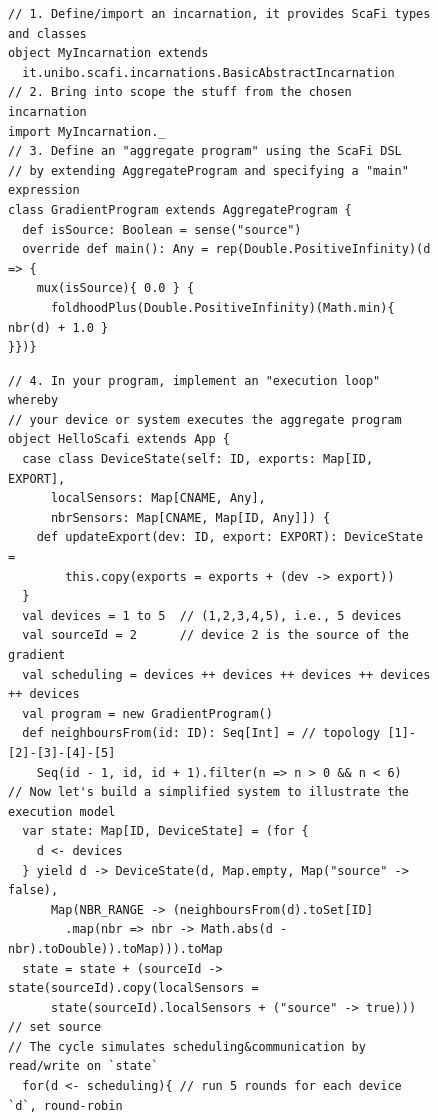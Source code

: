\begin{figure}
\newsavebox{\exoprogram}
\begin{lrbox}{\exoprogram}%
\begin{lstlisting}[basicstyle=\lst@ifdisplaystyle\footnotesize\fi\ttfamily]
// 1. Define/import an incarnation, it provides ScaFi types and classes
object MyIncarnation extends
  it.unibo.scafi.incarnations.BasicAbstractIncarnation
// 2. Bring into scope the stuff from the chosen incarnation
import MyIncarnation._
// 3. Define an "aggregate program" using the ScaFi DSL 
// by extending AggregateProgram and specifying a "main" expression
class GradientProgram extends AggregateProgram {
  def isSource: Boolean = sense("source")
  override def main(): Any = rep(Double.PositiveInfinity)(d => {
    mux(isSource){ 0.0 } {
      foldhoodPlus(Double.PositiveInfinity)(Math.min){ nbr(d) + 1.0 } 
}})}
\end{lstlisting}
\end{lrbox}
\newsavebox{\exosystem}
\begin{lrbox}{\exosystem}%
\begin{lstlisting}[deletekeywords={[2]{nbr}},
emph={state}, basicstyle=\lst@ifdisplaystyle\footnotesize\fi\ttfamily]
// 4. In your program, implement an "execution loop" whereby
// your device or system executes the aggregate program
object HelloScafi extends App {
  case class DeviceState(self: ID, exports: Map[ID, EXPORT],
      localSensors: Map[CNAME, Any], 
      nbrSensors: Map[CNAME, Map[ID, Any]]) {
    def updateExport(dev: ID, export: EXPORT): DeviceState = 
        this.copy(exports = exports + (dev -> export))
  }
  val devices = 1 to 5  // (1,2,3,4,5), i.e., 5 devices
  val sourceId = 2      // device 2 is the source of the gradient
  val scheduling = devices ++ devices ++ devices ++ devices ++ devices
  val program = new GradientProgram()
  def neighboursFrom(id: ID): Seq[Int] = // topology [1]-[2]-[3]-[4]-[5]
    Seq(id - 1, id, id + 1).filter(n => n > 0 && n < 6)
// Now let's build a simplified system to illustrate the execution model
  var state: Map[ID, DeviceState] = (for {
    d <- devices
  } yield d -> DeviceState(d, Map.empty, Map("source" -> false),
      Map(NBR_RANGE -> (neighboursFrom(d).toSet[ID]
        .map(nbr => nbr -> Math.abs(d - nbr).toDouble)).toMap))).toMap
  state = state + (sourceId -> state(sourceId).copy(localSensors =
      state(sourceId).localSensors + ("source" -> true))) // set source
// The cycle simulates scheduling&communication by read/write on `state`
  for(d <- scheduling){ // run 5 rounds for each device `d`, round-robin

\end{lstlisting}
\end{lrbox}
\end{figure}
